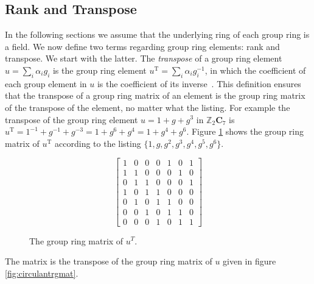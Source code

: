 \subsection{Rank and Transpose}
\label{sect:ranktranspose}
In the following sections we assume that the underlying ring of each group ring is a field.
We now define two terms regarding group ring elements: rank and transpose.
We start with the latter.
The \emph{transpose} of a group ring element $u = \sum_i \alpha_i g_i$ is the group ring element $u^{\textrm{T}} = \sum_i \alpha_i g_i^{-1}$, in which the coefficient of each group element in $u$ is the coefficient of its inverse~\cite{hur07,hur09}.
This definition ensures that the transpose of a group ring matrix of an element is the group ring matrix of the transpose of the element, no matter what the listing.
For example the transpose of the group ring element $u=1+g+g^3$ in $\mathbb{Z}_2 \mathbf{C}_7$ is $u^{\textrm{T}} = 1^{-1} + g^{-1} + g^{-3} = 1 + g^6 + g^4 = 1+ g^4+g^6$.
Figure \ref{fig:othergmatc7} shows the group ring matrix of $u^{\textrm{T}}$ according to the listing $\{1,g,g^2,g^3,g^4,g^5,g^6\}$.
\begin{figure}[htbp]
\begin{center}
\[
\left[
\begin{array}{ccccccc}
1 & 0 & 0 & 0 & 1 & 0 & 1 \\
1 & 1 & 0 & 0 & 0 & 1 & 0 \\
0 & 1 & 1 & 0 & 0 & 0 & 1 \\
1 & 0 & 1 & 1 & 0 & 0 & 0 \\
0 & 1 & 0 & 1 & 1 & 0 & 0 \\
0 & 0 & 1 & 0 & 1 & 1 & 0 \\
0 & 0 & 0 & 1 & 0 & 1 & 1
\end{array}
\right]
\]
\caption{The group ring matrix of $u^T$.}
\label{fig:othergmatc7}
\end{center}
\end{figure}
The matrix is the transpose of the group ring matrix of $u$ given in figure \ref{fig:circulantrgmat}.

